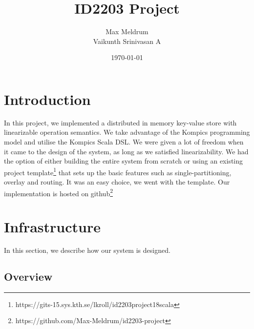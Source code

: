 \documentclass[12pt]{article}
\title{\textbf{ID2203 Project}}
\author{Max Meldrum\\
	Vaikunth Srinivasan A}
\date{\today}
\begin{document}
\maketitle

\section{Introduction}
In this project, we implemented a distributed in memory key-value store with linearizable operation semantics. We take advantage of the Kompics \cite{DBLP:conf/p2p/AradDH09} programming model and utilise the Kompics Scala DSL. We were given a lot of freedom when it came to the design of the system, as long as we satisfied linearizability. We had the option of either building the entire system from scratch or using an existing project template\footnote{https://gits-15.sys.kth.se/lkroll/id2203project18scala} that sets up the basic features such as single-partitioning, overlay and routing. It was an easy choice, we went with the template. Our implementation is hosted on github\footnote{https://github.com/Max-Meldrum/id2203-project}

\section{Infrastructure}
In this section, we describe how our system is designed.

\subsection{Overview}
\end{document}
